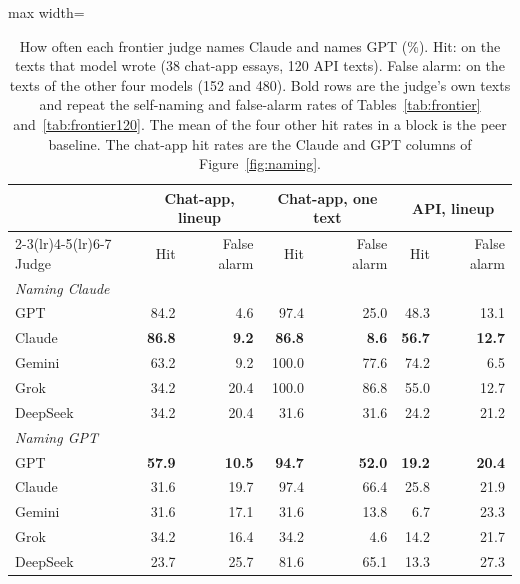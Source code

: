 \begin{table}[t]
\centering\small
\setlength\tabcolsep{4pt}
\begin{adjustbox}{max width=\linewidth}
\begin{tabular}{l rr rr rr}
\toprule
 & \multicolumn{2}{c}{Chat-app, lineup} & \multicolumn{2}{c}{Chat-app, one text} & \multicolumn{2}{c}{API, lineup} \\
\cmidrule(lr){2-3}\cmidrule(lr){4-5}\cmidrule(lr){6-7}
Judge & Hit & False alarm & Hit & False alarm & Hit & False alarm \\
\midrule
\multicolumn{7}{l}{\emph{Naming Claude}} \\
GPT & 84.2 & 4.6 & 97.4 & 25.0 & 48.3 & 13.1 \\
Claude & \textbf{86.8} & \textbf{9.2} & \textbf{86.8} & \textbf{8.6} & \textbf{56.7} & \textbf{12.7} \\
Gemini & 63.2 & 9.2 & 100.0 & 77.6 & 74.2 & 6.5 \\
Grok & 34.2 & 20.4 & 100.0 & 86.8 & 55.0 & 12.7 \\
DeepSeek & 34.2 & 20.4 & 31.6 & 31.6 & 24.2 & 21.2 \\
\midrule
\multicolumn{7}{l}{\emph{Naming GPT}} \\
GPT & \textbf{57.9} & \textbf{10.5} & \textbf{94.7} & \textbf{52.0} & \textbf{19.2} & \textbf{20.4} \\
Claude & 31.6 & 19.7 & 97.4 & 66.4 & 25.8 & 21.9 \\
Gemini & 31.6 & 17.1 & 31.6 & 13.8 & 6.7 & 23.3 \\
Grok & 34.2 & 16.4 & 34.2 & 4.6 & 14.2 & 21.7 \\
DeepSeek & 23.7 & 25.7 & 81.6 & 65.1 & 13.3 & 27.3 \\
\bottomrule
\end{tabular}
\end{adjustbox}
\caption{How often each frontier judge names Claude and names GPT (\%). Hit: on the texts that model wrote (38 chat-app essays, 120 API texts). False alarm: on the texts of the other four models (152 and 480). Bold rows are the judge's own texts and repeat the self-naming and false-alarm rates of Tables~\ref{tab:frontier} and~\ref{tab:frontier120}. The mean of the four other hit rates in a block is the peer baseline. The chat-app hit rates are the Claude and GPT columns of Figure~\ref{fig:naming}.}
\label{tab:naming}
\end{table}
